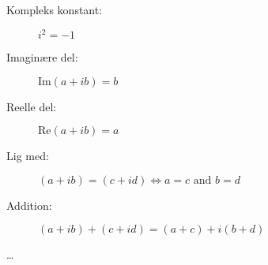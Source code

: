 \documentclass[12pt]{article}
\begin{document}
\begin{description}
\item[Kompleks konstant:] $i^2=-1$
\item[Imaginære del:] $\text{Im}(a+ib)=b$
\item[Reelle del:] $\text{Re}(a+ib)=a$
\item[Lig med:] $(a+ib)=(c+id) \Leftrightarrow a=c \text{ and } b=d$
\item[Addition:] $(a+ib)+(c+id)=(a+c)+i(b+d)$
\item[\dots]
\end{description}
\end{document}
